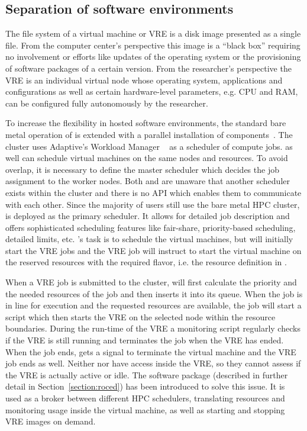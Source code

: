 \subsection{Separation of software environments}

The file system of a virtual machine or VRE is a
disk image presented as a single file. From the computer center's perspective
this image is a ``black box'' requiring no involvement or efforts like
updates of the operating system or the provisioning of software packages of a
certain version. From the researcher's perspective the VRE is an individual
virtual node whose operating system, applications and configurations
as well as certain hardware-level parameters, e.g. CPU and RAM, can be
configured fully autonomously by the researcher.


To increase the flexibility in hosted software environments, the standard bare metal
operation of \NEMO is extended with a parallel installation of \Openstack
components~\cite{hpc-symp:2016}.
The \NEMO cluster uses Adaptive's Workload Manager \Moab~\cite{Moab} as a
scheduler of compute jobs.
\Openstack as well can schedule virtual machines on the same nodes and
resources.
To avoid overlap, it is necessary to define the master scheduler
which decides the job assignment to the worker nodes.
Both \Moab and \Openstack are
unaware that another scheduler exists within the cluster and there is
no API which enables them to  communicate with each other. Since the majority of users still use the
bare metal HPC cluster, \Moab is deployed as the primary scheduler. It allows for
detailed job description and offers sophisticated scheduling features like
fair-share, priority-based scheduling, detailed limits,
etc. \Openstack 's task is to schedule the virtual machines, but \Moab will initially start the VRE
jobs and the VRE job will instruct \Openstack to start the virtual machine on the
reserved resources with the required flavor, i.e. the resource definition in \Openstack.

When a VRE job is submitted to the \NEMO cluster, \Moab will first calculate the
priority and the needed resources of the job and then inserts it into its queue.
When the job is in line for execution and the requested resources are available,
the job will start a script which then starts the VRE on the selected node
within the resource boundaries. During the run-time of the VRE a monitoring
script regularly checks if the VRE is still running and terminates the job when
the VRE has ended.
When the job ends, \Openstack gets a signal to terminate the virtual machine and
the VRE job ends as well.  Neither \Moab nor \Openstack have access
inside the VRE, so they cannot assess if the VRE is actually active or
idle.
The software package \Roced (described in
further detail in Section~\ref{section:roced}) has been introduced to
solve this issue.
It is used as a broker between
different HPC schedulers,  translating resources and monitoring usage inside the
virtual machine, as well as starting and stopping VRE images on demand.
